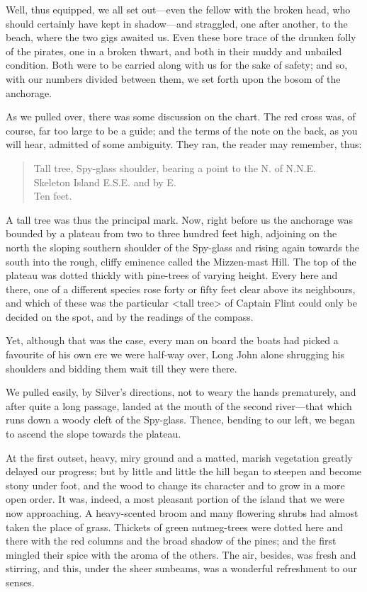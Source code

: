 Well, thus equipped, we all set out—even the fellow with the broken head, who should certainly have kept in shadow—and straggled, one after another, to the beach, where the two gigs awaited us. Even these bore trace of the drunken folly of the pirates, one in a broken thwart, and both in their muddy and unbailed condition. Both were to be carried along with us for the sake of safety; and so, with our numbers divided between them, we set forth upon the bosom of the anchorage.

As we pulled over, there was some discussion on the chart. The red cross was, of course, far too large to be a guide; and the terms of the note on the back, as you will hear, admitted of some ambiguity. They ran, the reader may remember, thus:

\blockquote{Tall tree, Spy-glass shoulder, bearing a point to the N\@. of N\@.N\@.E\@.\\
Skeleton Island E\@.S\@.E\@. and by E\@.\\
Ten feet.}

A tall tree was thus the principal mark. Now, right before us the anchorage was bounded by a plateau from two to three hundred feet high, adjoining on the north the sloping southern shoulder of the Spy-glass and rising again towards the south into the rough, cliffy eminence called the Mizzen-mast Hill. The top of the plateau was dotted thickly with pine-trees of varying height. Every here and there, one of a different species rose forty or fifty feet clear above its neighbours, and which of these was the particular <tall tree> of Captain Flint could only be decided on the spot, and by the readings of the compass.

Yet, although that was the case, every man on board the boats had picked a favourite of his own ere we were half-way over, Long John alone shrugging his shoulders and bidding them wait till they were there.

We pulled easily, by Silver's directions, not to weary the hands prematurely, and after quite a long passage, landed at the mouth of the second river—that which runs down a woody cleft of the Spy-glass. Thence, bending to our left, we began to ascend the slope towards the plateau.

At the first outset, heavy, miry ground and a matted, marish vegetation greatly delayed our progress; but by little and little the hill began to steepen and become stony under foot, and the wood to change its character and to grow in a more open order. It was, indeed, a most pleasant portion of the island that we were now approaching. A heavy-scented broom and many flowering shrubs had almost taken the place of grass. Thickets of green nutmeg-trees were dotted here and there with the red columns and the broad shadow of the pines; and the first mingled their spice with the aroma of the others. The air, besides, was fresh and stirring, and this, under the sheer sunbeams, was a wonderful refreshment to our senses.

